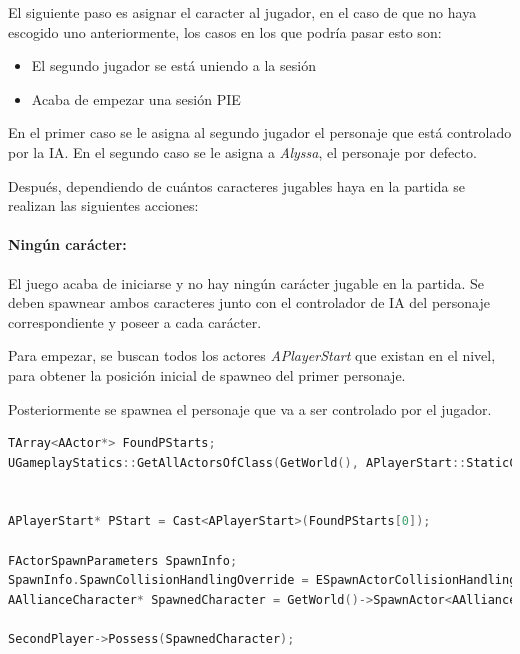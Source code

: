 El siguiente paso es asignar el caracter al jugador, en el caso de que no haya escogido uno anteriormente, los casos en los que podría pasar esto son:

\begin{itemize}
	\item El segundo jugador se está uniendo a la sesión
	\item Acaba de empezar una sesión \ac{PIE}
\end{itemize}

En el primer caso se le asigna al segundo jugador el personaje que está controlado por la IA.
En el segundo caso se le asigna a \textit{Alyssa}, el personaje por defecto.

Después, dependiendo de cuántos caracteres jugables haya en la partida se realizan las siguientes acciones:

\paragraph{Ningún carácter:}

El juego acaba de iniciarse y no hay ningún carácter jugable en la partida. Se deben spawnear ambos caracteres junto con el controlador de IA del personaje correspondiente y poseer a cada carácter.

Para empezar, se buscan todos los actores \textit{APlayerStart} que existan en el nivel, para obtener la posición inicial de spawneo del primer personaje.

Posteriormente se spawnea el personaje que va a ser controlado por el jugador.

\begin{lstlisting}[language=c++,caption={Búsqueda de playerstarts y spawneo de personaje controlado por el jugador},captionpos=b,label={lstRespawnZeroCharsSpawnPlayer}]
TArray<AActor*> FoundPStarts;
UGameplayStatics::GetAllActorsOfClass(GetWorld(), APlayerStart::StaticClass(), FoundPStarts);


APlayerStart* PStart = Cast<APlayerStart>(FoundPStarts[0]);

FActorSpawnParameters SpawnInfo;
SpawnInfo.SpawnCollisionHandlingOverride = ESpawnActorCollisionHandlingMethod::AlwaysSpawn;
AAllianceCharacter* SpawnedCharacter = GetWorld()->SpawnActor<AAllianceCharacter>(AssignedCharacter, PStart->GetActorLocation() , PStart->GetActorRotation(), SpawnInfo);

SecondPlayer->Possess(SpawnedCharacter);
\end{lstlisting} \\

